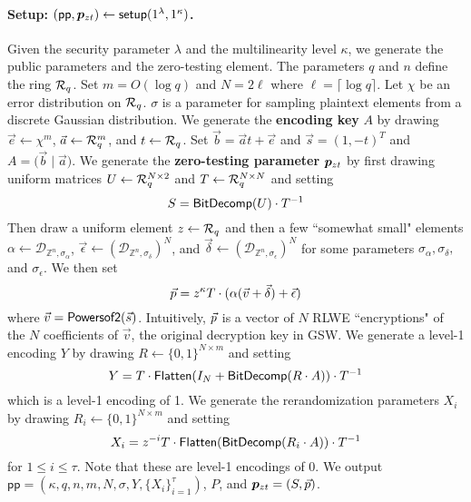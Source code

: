 \paragraph{Setup: $(\mathsf{pp},\bm{p}_{zt}) \leftarrow \mathsf{setup}(1^\lambda, 1^\kappa)$.}  Given the security parameter $\lambda$ and the multilinearity level $\kappa$, we generate the public parameters and the zero-testing element.  The parameters $q$ and $n$ define the ring $\mathcal{R}_q$.  Set $m = O(\log q)$ and $N = 2\ell$ where $\ell = \lceil \log q \rceil$.  Let $\chi$ be an error distribution on $\mathcal{R}_q$.  $\sigma$ is a parameter for sampling plaintext elements from a discrete Gaussian distribution.  We generate the {\bf encoding key} $A$ by drawing $\vec{e} \leftarrow \chi^m$, $\vec{a} \leftarrow \mathcal{R}_q^m$, and $t \leftarrow \mathcal{R}_q$.  Set $\vec{b} = \vec{a}t + \vec{e}$ and $\vec{s} = (1, -t)^T$ and $A = \big(\vec{b} \; \big| \; \vec{a}\big)$.  We generate the {\bf zero-testing parameter} $\bm{p}_{zt}$ by first drawing uniform matrices $U \leftarrow \mathcal{R}_q^{N\times 2}$ and $T \leftarrow \mathcal{R}_q^{N \times N}$ and setting $$S = \mathsf{BitDecomp}(U)\cdot T^{-1}$$  Then draw a uniform element $z \leftarrow \mathcal{R}_q$ and then a few ``somewhat small" elements $\alpha \leftarrow \mathcal{D}_{\mathbb{Z}^n, \sigma_\alpha}$, $\vec{\epsilon} \leftarrow (\mathcal{D}_{\mathbb{Z}^n, \sigma_\delta})^N$, and $\vec{\delta} \leftarrow (\mathcal{D}_{\mathbb{Z}^n, \sigma_\epsilon})^N$ for some parameters $\sigma_\alpha, \sigma_\delta,$ and $\sigma_\epsilon$.  We then set $$\vec{p} = z^\kappa T\cdot (\alpha(\vec{v} + \vec{\delta}) + \vec{\epsilon})$$ where $\vec{v} =  \mathsf{Powersof2}(\vec{s})$.  Intuitively, $\vec{p}$ is a vector of $N$ RLWE ``encryptions" of the $N$ coefficients of $\vec{v}$, the original decryption key in GSW.  We generate a level-1 encoding $Y$ by drawing $R \leftarrow \{0,1\}^{N\times m}$ and setting $$Y = T\cdot\mathsf{Flatten}(I_N + \mathsf{BitDecomp}(R\cdot A))\cdot T^{-1}$$  which is a level-1 encoding of 1. We generate the rerandomization parameters $X_i$ by drawing $R_i \leftarrow \{0,1\}^{N \times m}$ and setting $$X_i = z^{-i}T\cdot\mathsf{Flatten}(\mathsf{BitDecomp}(R_i\cdot A))\cdot T^{-1}$$ for $1 \leq i \leq \tau$.  Note that these are level-1 encodings of 0. We output $\mathsf{pp} = (\kappa, q,n,m,N,\sigma, Y, \{X_i\}_{i=1}^\tau)$, $P$, and $\bm{p}_{zt} = (S,\vec{p})$.

